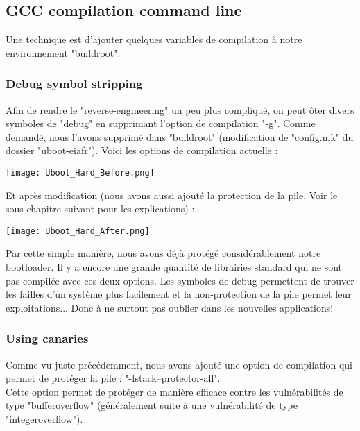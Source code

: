 \subsection{GCC compilation command line}
Une technique est d'ajouter quelques variables de compilation à notre environnement "buildroot".  

\subsubsection{Debug symbol stripping}
Afin de rendre le "reverse-engineering" un peu plus compliqué, on peut ôter divers symboles de "debug" en supprimant l'option de compilation "-g". Comme demandé, nous l'avons supprimé dans "buildroot" (modification de "config.mk" du dossier "uboot-eiafr"). Voici les options de compilation actuelle : 
\begin{center} 
\hspace{15cm}
\texttt{[image: Uboot\_Hard\_Before.png]}
\end{center}
\vspace{0.5cm} 

Et après modification (nous avons aussi ajouté la protection de la pile. Voir le sous-chapitre suivant pour les explications) :
\begin{center} 
\hspace{15cm}
\texttt{[image: Uboot\_Hard\_After.png]}
\end{center}
\vspace{0.5cm} 

Par cette simple manière, nous avons déjà protégé considérablement notre bootloader. Il y a encore une grande quantité de librairies standard qui ne sont pas compilée avec ces deux options. Les symboles de debug permettent de trouver les failles d'un système plus facilement et la non-protection de la pile permet leur exploitations... Donc à ne surtout pas oublier dans les nouvelles applications! 
\pagebreak

\subsubsection{Using canaries}
Comme vu juste précédemment, nous avons ajouté une option de compilation qui permet de protéger la pile : "-fstack--protector-all". \\
Cette option permet de protéger de manière efficace contre les vulnérabilités de type "bufferoverflow" (généralement suite à une vulnérabilité de type "integeroverflow"). \\

